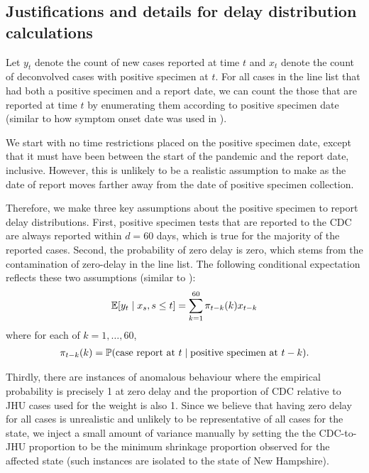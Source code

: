 \subsection{Justifications and details for delay distribution calculations}
\label{supp:delay-justifications}

Let $y_t$ denote the count of new cases reported at time $t$ and $x_t$ denote
the count of deconvolved cases with positive specimen at $t$. 
For all cases in the line list that had both a positive specimen and a report date, we can count
the those that are reported at time $t$ by enumerating them according to
positive specimen date (similar to how symptom onset date was used in
\citealp{jahja2022real}).

We start with no time restrictions placed on the positive specimen date, except that
it must have been between the start of the pandemic and the report date,
inclusive. However, 
this is unlikely to be a realistic assumption to make as the date of report moves
farther away from the date of positive specimen collection.

Therefore, we make three key assumptions about the positive specimen to report delay distributions. 
First, positive specimen tests that are reported to the CDC are always reported within $d = 60$
days, which is true for the majority of the reported cases. Second, the
probability of zero delay is zero, which stems from the contamination of
zero-delay in the line list. The following conditional expectation reflects these two assumptions 
(similar to \citep{jahja2022real}): 
\begin{align*}
\E[y_t \mid x_s, s \leq t] = \sum_{k=1}^{60} \pi_{t-k}(k) x_{t-k}
\end{align*}
where for each of $k = 1, \dots, 60$,
\begin{align*}
\pi_{t-k}(k) = \P(\text{case report at }t \mid \text{positive specimen at }t-k).
\end{align*}

Thirdly, there are instances of anomalous behaviour where the empirical probability 
is precisely 1 at zero delay and the proportion of CDC relative
to JHU cases used for the weight is also 1. Since we believe that having zero
delay for all cases is unrealistic and unlikely to be representative of all
cases for the state, we inject a small amount of variance manually by setting
the the CDC-to-JHU proportion to be the minimum shrinkage proportion observed
for the affected state (such instances are isolated to the state of New Hampshire).

